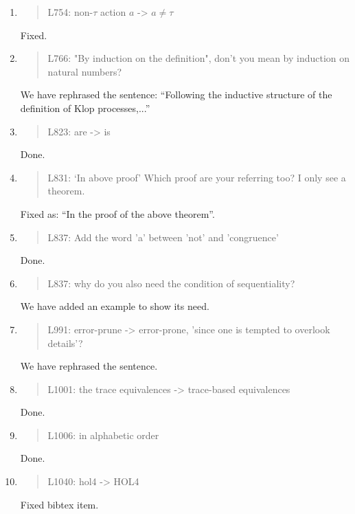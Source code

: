 \begin{enumerate}
\item \begin{quote}
    L754: non-$\tau$ action $a$ -> $a\neq\tau$
  \end{quote}
  \Mark
  Fixed.
  
\item \begin{quote}
    L766: "By induction on the definition", don't you mean by induction on natural numbers?
  \end{quote}
  \Mark
  We have rephrased the sentence: ``Following the inductive structure
  of the definition of Klop processes,...''
  
\item \begin{quote}
    L823: are -> is
  \end{quote}
  \Mark
  Done.
  
\item \begin{quote}
    L831: `In above proof’ Which proof are your referring too? I only see a theorem.
  \end{quote}
  \Mark
  Fixed as: ``In the proof of the above theorem''.
  
\item \begin{quote}
    L837: Add the word 'a' between 'not' and 'congruence'
  \end{quote}
  \Mark
  Done.
  
\item \begin{quote}
    L837: why do you also need the condition of sequentiality?
  \end{quote}
  \Mark
  We have added an example to show its need.
  
\item \begin{quote}
    L991: error-prune -> error-prone, ’since one is tempted to overlook details’?
  \end{quote}
  \Mark
  We have rephrased the sentence.
  
\item \begin{quote}
    L1001: the trace equivalences -> trace-based equivalences
  \end{quote}
  \Mark
  Done.
  
\item \begin{quote}
    L1006: in alphabetic order
  \end{quote}
  \Mark
  Done.
  
\item \begin{quote}
    L1040: hol4 -> HOL4
  \end{quote}
  \Mark
  Fixed bibtex item.
  
\end{enumerate}
